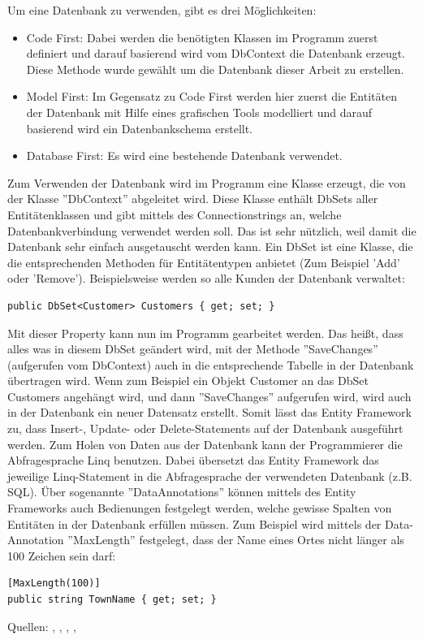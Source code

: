 Um eine Datenbank zu verwenden, gibt es drei Möglichkeiten:
\begin{itemize}
\item Code First: Dabei werden die benötigten Klassen im Programm zuerst definiert und darauf basierend wird vom DbContext die Datenbank erzeugt. Diese Methode wurde gewählt um die Datenbank dieser Arbeit zu erstellen.
\item Model First: Im Gegensatz zu Code First werden hier zuerst die Entitäten der Datenbank mit Hilfe eines grafischen Tools modelliert und darauf basierend wird ein Datenbankschema erstellt.
\item Database First: Es wird eine bestehende Datenbank verwendet.
\end{itemize}
Zum Verwenden der Datenbank wird im Programm eine Klasse erzeugt, die von der Klasse ''DbContext'' abgeleitet wird. Diese Klasse enthält DbSets aller Entitätenklassen und gibt mittels des Connectionstrings an, welche Datenbankverbindung verwendet werden soll. Das ist sehr nützlich, weil damit die Datenbank sehr einfach ausgetauscht werden kann. Ein DbSet ist eine Klasse, die die entsprechenden Methoden für Entitätentypen anbietet (Zum Beispiel 'Add' oder 'Remove'). \newline Beispielsweise werden so alle Kunden der Datenbank verwaltet: 
\begin{lstlisting}
public DbSet<Customer> Customers { get; set; }
\end{lstlisting}
Mit dieser Property kann nun im Programm gearbeitet werden. Das heißt, dass alles was in diesem DbSet geändert wird, mit der Methode ''SaveChanges'' (aufgerufen vom  DbContext) auch in die entsprechende Tabelle in der Datenbank übertragen wird. Wenn zum Beispiel ein Objekt Customer an das DbSet Customers angehängt wird, und dann ''SaveChanges'' aufgerufen wird, wird auch in der Datenbank ein neuer Datensatz erstellt. Somit lässt das Entity Framework zu, dass Insert-, Update- oder Delete-Statements auf der Datenbank ausgeführt werden.
Zum Holen von Daten aus der Datenbank kann der Programmierer die Abfragesprache Linq benutzen. Dabei übersetzt das Entity Framework das jeweilige Linq-Statement in die Abfragesprache der verwendeten Datenbank (z.B. SQL). Über sogenannte ''DataAnnotations'' können mittels des Entity Frameworks auch Bedienungen festgelegt werden, welche gewisse Spalten von Entitäten in der Datenbank erfüllen müssen. Zum Beispiel wird mittels der Data-Annotation ''MaxLength'' festgelegt, dass der Name eines Ortes nicht länger als 100 Zeichen sein darf:
\begin{lstlisting}
[MaxLength(100)]
public string TownName { get; set; }
\end{lstlisting}
Quellen: \cite{wikipedia_entity_2017}, \cite{entityframework_tutorial_what_2018}, \cite{wikipedia_objektrelationale_2016}, \cite{microsoft_entity_connections_2018}, \cite{microsoft_entity_2018}
